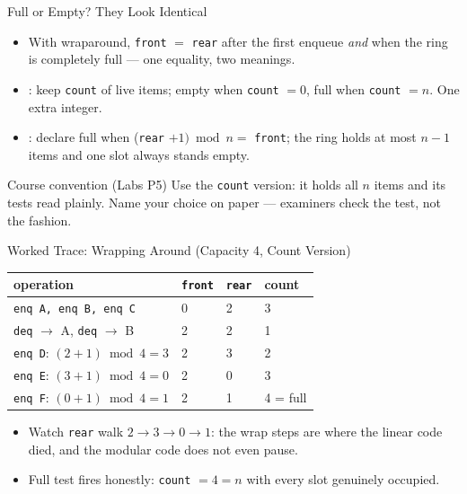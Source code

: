 \documentclass[aspectratio=169]{beamer}
\begin{document}
\begin{frame}{Full or Empty? They Look Identical}
  \begin{itemize}
    \item With wraparound, \texttt{front} $=$ \texttt{rear} after the first
      enqueue \emph{and} when the ring is completely full --- one equality,
      two meanings.
    \item {}: keep \texttt{count} of live items; empty when
      \texttt{count} $= 0$, full when \texttt{count} $= n$. One extra integer.
    \item {}: declare full when
      (\texttt{rear} $+ 1) \bmod n =$ \texttt{front}; the ring holds at most
      $n - 1$ items and one slot always stands empty.
  \end{itemize}
  \begin{exampleblock}{Course convention (Labs P5)}
    Use the \texttt{count} version: it holds all $n$ items and its tests read
    plainly. Name your choice on paper --- examiners check the test, not the
    fashion.
  \end{exampleblock}
\end{frame}

\begin{frame}{Worked Trace: Wrapping Around (Capacity 4, Count Version)}
  \begin{center}
  {\small
  \begin{tabular}{llll}
    \toprule
    \textbf{operation} & \texttt{front} & \texttt{rear} & \textbf{count} \\
    \midrule
    \texttt{enq A, enq B, enq C} & 0 & 2 & 3 \\
    \texttt{deq} $\to$ A, \texttt{deq} $\to$ B & 2 & 2 & 1 \\
    \texttt{enq D}: $(2+1) \bmod 4 = 3$ & 2 & 3 & 2 \\
    \texttt{enq E}: $(3+1) \bmod 4 = 0$ & 2 & 0 & 3 \\
    \texttt{enq F}: $(0+1) \bmod 4 = 1$ & 2 & 1 & 4 = full \\
    \bottomrule
  \end{tabular}}
  \end{center}
  \begin{itemize}
    \item Watch \texttt{rear} walk $2 \to 3 \to 0 \to 1$: the wrap steps are
      where the linear code died, and the modular code does not even pause.
    \item Full test fires honestly: \texttt{count} $= 4 = n$ with every slot
      genuinely occupied.
  \end{itemize}
\end{frame}
\end{document}

